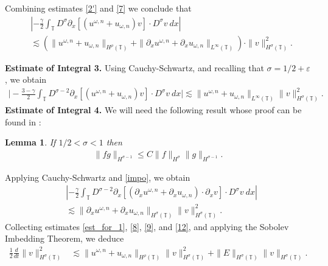 \documentclass[12pt,reqno]{amsart}
\newcommand{\p}{\partial}
\newcommand{\ci}{\mathbb{T}}
\newcommand{\ee}{\varepsilon}
\theoremstyle{plain}  %
\newtheorem{lemma}{Lemma}
\theoremstyle{definition}
\begin{document}
%
%
Combining estimates \eqref{2'} and \eqref{7} we conclude that
%
%
\begin{equation}
\begin{split}
& \left | -\frac{\gamma}{2} \int_{\ci} D^\sigma \p_x \left[ \left( 
u^{\omega,n} + u_{\omega,n}
\right)v \right]  \cdot D^\sigma v \ dx \right |
\\
& \lesssim (\|u^{\omega,n} + u_{\omega,n}\|_{H^{\rho}(\ci)} + \|\p_x 
u^{\omega,n} +
\p_x u_{\omega,n}\|_{L^\infty(\ci)} ) \cdot \|v\|_{H^\sigma(\ci)}^2.
\label{8}
\end{split}
\end{equation}
%
%
%

{\bf Estimate of Integral 3.} Using Cauchy-Schwartz, and recalling that
$\sigma = 1/2 + \ee$,  we obtain
%
%
\begin{equation}
\begin{split}
\bigg | -\frac{3-\gamma}{2} \int_{\ci} D^{\sigma -2} \p_x \left[
(u^{\omega,n} + u_{\omega,n})v \right]
\cdot D^\sigma v \ dx \bigg |
 \lesssim \|u^{\omega,n} + u_{\omega,n} \|_{L^\infty(\ci)} 
\|v\|_{H^\sigma(\ci)}^2.
\label{9}
\end{split}
\end{equation}
%
%
%
{\bf Estimate of Integral 4.}
We will need the following result whose proof can be found in 
\cite{Himonas_2009_Non-uniform-dep-per}:
%
%
%
\begin{lemma}
\label{impo}
If  $1/2 < \sigma < 1 $ then
%
%
\begin{equation}
\begin{split}
\|fg\|_{H^{\sigma - 1}} \le C \|f\|_{H^{\sigma}}
\|g\|_{H^{\sigma -1}}.
\label{11}
\end{split}
\end{equation}
%
%
\end{lemma}
%
Applying Cauchy-Schwartz and  \autoref{impo}, we obtain
%
%
\begin{equation}
\begin{split}
& \left | -\frac{\gamma}{2} \int_{\ci} D^{\sigma -2 } \p_x \left[
\left( \p_x u^{\omega,n} + \p_x u_{\omega,n} \right) \cdot \p_x v
\right] \cdot D^\sigma v \ dx \right |
\\
& \lesssim \|\p_x u^{\omega,n} + \p_x u_{\omega,n}
\|_{H^\sigma(\ci)} \|v\|_{H^\sigma(\ci)}^2.
\label{12}
\end{split}
\end{equation}
%
%
Collecting estimates \eqref{est_for_1}, \eqref{8}, \eqref{9}, and
\eqref{12}, and applying the Sobolev Imbedding Theorem, we deduce
%
%
\begin{equation}
\begin{split}
\frac{1}{2}\frac{d}{dt} \|v\|_{H^\sigma(\ci)}^2
& \lesssim
\|u^{\omega,n} + u_{\omega,n}\|_{H^{\rho}(\ci)} \|v\|_{H^\sigma(\ci)}^2
+ \|E\|_{H^\sigma(\ci)}
\|v\|_{H^\sigma(\ci)}.
\label{10}
\end{split}
\end{equation}
\end{document}
